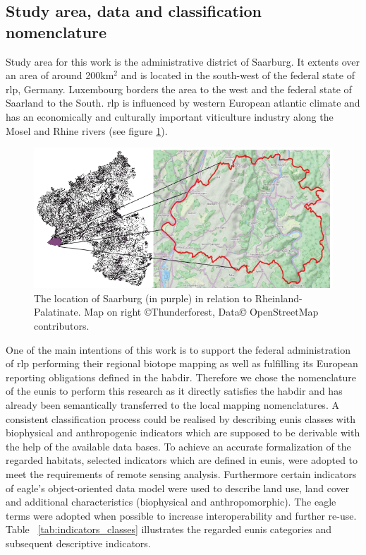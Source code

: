 \documentclass[authoryear,review,12pt,number]{elsarticle}
\begin{document}
\subsection{Study area, data and classification nomenclature}
\label{sec:usecase_data}
Study area for this work is the administrative district of Saarburg. It extents
over an area of around 200km$^{2}$ and is
located in the south-west of the federal state of \gls{rlp}, Germany.
Luxembourg borders the area to the west and the federal state of Saarland to the
South. \gls{rlp} is influenced by western European atlantic climate and has an
economically and culturally important viticulture industry along the Mosel and Rhine rivers
(see figure \ref{fig:study_area}).
\begin{figure}
    \includegraphics[width=\textwidth]{diagrams/study_area_closeup.png}
    \caption{The location of Saarburg (in purple) in relation to
    Rheinland-Palatinate. Map on right \copyright Thunderforest, Data\copyright
    OpenStreetMap contributors.}
\label{fig:study_area}
\end{figure}

One of the main intentions of this work is to support the federal administration
of \gls{rlp} performing their regional biotope mapping as well as fulfilling its
European reporting obligations defined in the \gls{habdir}. Therefore we chose
the nomenclature of the \gls{eunis} to perform this research as it directly
satisfies the \gls{habdir} and has already been semantically transferred to the
local mapping nomenclatures. A consistent classification process could be realised by
describing \gls{eunis} classes with biophysical and anthropogenic indicators
which are supposed to be derivable with the help of the available data bases. To
achieve an accurate formalization of the regarded habitats, selected indicators
which are defined in \gls{eunis}, were adopted to meet the requirements of
remote sensing analysis.
Furthermore certain indicators of \gls{eagle}'s object-oriented data
model were used to describe land use, land cover and additional characteristics
(biophysical and anthropomorphic). The \gls{eagle} terms were adopted when possible to increase
interoperability and further re-use. Table ~\ref{tab:indicators_classes}
illustrates the regarded \gls{eunis} categories and subsequent descriptive
indicators.
\end{document}
